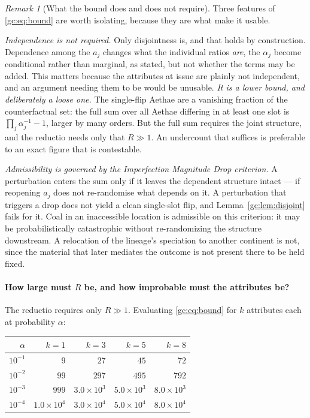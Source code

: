 \documentclass[11pt]{article}
\numberwithin{equation}{section}
\theoremstyle{plain}
\theoremstyle{definition}
\theoremstyle{remark}
\newtheorem{remark}[theorem]{Remark}
\begin{document}
\begin{remark}[What the bound does and does not require]
\label{gc:rem:boundrequires}
Three features of \eqref{gc:eq:bound} are worth isolating, because they
are what make it usable.

\emph{Independence is not required.} Only disjointness is, and that
holds by construction. Dependence among the $a_j$ changes what the
individual ratios \emph{are}, the $\alpha_j$ become conditional
rather than marginal, as stated, but not whether the terms may be
added. This matters because the attributes at issue are plainly not
independent, and an argument needing them to be would be unusable. \emph{It is a lower bound, and deliberately a loose one.} The
single-flip Aethae are a vanishing fraction of the counterfactual set:
the full sum over all Aethae differing in at least one slot is
$\prod_j\alpha_j^{-1}-1$, larger by many orders. But the full sum
requires the joint structure, and the reductio needs only that $R\gg1$.
An undercount that suffices is preferable to an exact figure that is
contestable.

\emph{Admissibility is governed by the Imperfection Magnitude Drop
criterion.} A perturbation enters the sum only if it leaves the
dependent structure intact --- if reopening $a_j$ does not re-randomise
what depends on it. A perturbation that triggers a drop does not yield a
clean single-slot flip, and Lemma~\ref{gc:lem:disjoint} fails for it.
Coal in an inaccessible location is admissible on this criterion: it may
be probabilistically catastrophic without re-randomizing the structure
downstream. A relocation of the lineage's speciation to another
continent is not, since the material that later mediates the outcome is
not present there to be held fixed.
\end{remark}

\paragraph{How large must $R$ be, and how improbable must the
attributes be?} The reductio requires only $R\gg1$. Evaluating
\eqref{gc:eq:bound} for $k$ attributes each at probability $\alpha$:

\begin{center}\small
\begin{tabular}{@{}rrrrr@{}}
\toprule
$\alpha$ & $k=1$ & $k=3$ & $k=5$ & $k=8$\\
\midrule
$10^{-1}$ & $9$ & $27$ & $45$ & $72$\\
$10^{-2}$ & $99$ & $297$ & $495$ & $792$\\
$10^{-3}$ & $999$ & $3.0\times10^{3}$ & $5.0\times10^{3}$ & $8.0\times10^{3}$\\
$10^{-4}$ & $1.0\times10^{4}$ & $3.0\times10^{4}$ & $5.0\times10^{4}$ & $8.0\times10^{4}$\\
\bottomrule
\end{tabular}
\end{center}
\end{document}
